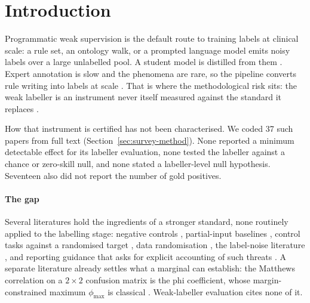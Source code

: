 \documentclass[review]{elsarticle}
\begin{document}
\section{Introduction}
\label{sec:intro}

Programmatic weak supervision is the default route to training labels at clinical
scale: a rule set, an ontology walk, or a prompted language model emits noisy labels over a large unlabelled pool. A student model is distilled
from them
\cite{ratner2016dataprogramming,ratner2017snorkel,hinton2015distilling,fries2021trove,dunnmon2020crossmodal}.
Expert annotation is slow and the phenomena are rare, so the pipeline converts
rule writing into labels at scale \cite{weiskopf2013quality,henry2020n2c2}. That is where the methodological risk sits: the weak labeller is an instrument
never itself measured against the standard it replaces
\cite{jacobs2021measurement,pangakis2023validation}.

How that instrument is certified has not been characterised. We coded 37 such
papers from full text (Section~\ref{sec:survey-method}). None reported a
minimum detectable effect for its labeller evaluation, none tested the labeller
against a chance or zero-skill null, and none stated a labeller-level null
hypothesis. Seventeen also did not report the number of gold positives.

\paragraph{The gap}
Several literatures hold the ingredients of a stronger standard, none routinely
applied to the labelling stage: negative controls
\cite{lipsitch2010negative}, partial-input baselines
\cite{poliak2018hypothesis,gururangan2018artifacts}, control tasks against a
randomised target \cite{hewitt2019control}, data randomisation
\cite{adebayo2018sanity}, the label-noise literature
\cite{frenay2014labelnoise,northcutt2021labelerrors,fogliato2020fairness}, and
reporting guidance that asks for explicit accounting of such threats
\cite{collins2024tripodai,sculley2015debt}. A separate literature already settles what a marginal can establish: the
Matthews correlation on a $2\times2$ confusion matrix is the phi coefficient,
whose margin-constrained maximum $\phi_{\max}$ is classical
\cite{cureton1959phimax,guilford1965phi}. Weak-labeller evaluation cites none of it.
\end{document}
